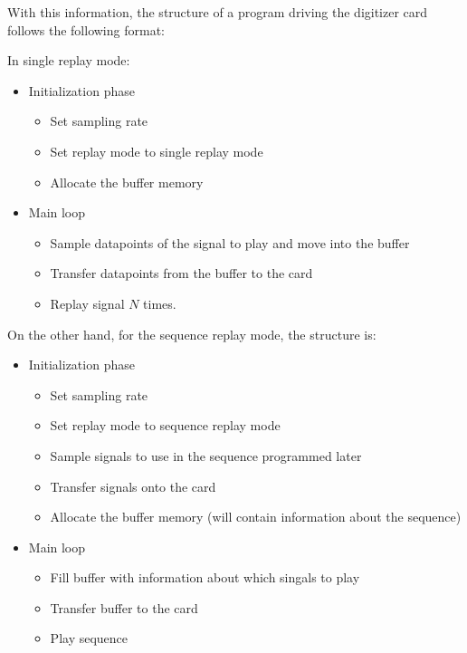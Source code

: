 With this information, the structure of a program driving the digitizer card follows the following format:

\begin{minipage}{\textwidth}
In single replay mode:

\begin{itemize}
\setlength\itemsep{0.0em}
	\item Initialization phase
		\begin{itemize}
			\item Set sampling rate
			\item Set replay mode to single replay mode
			\item Allocate the buffer memory
		\end{itemize}
	\item Main loop
		\begin{itemize}
			\item Sample datapoints of the signal to play and move into the buffer
			\item Transfer datapoints from the buffer to the card
			\item Replay signal $N$ times.
		\end{itemize}
\end{itemize}
\end{minipage}

\begin{minipage}{\textwidth}
On the other hand, for the sequence replay mode, the structure is:

\begin{itemize}
	\item Initialization phase
		\begin{itemize}
			\item Set sampling rate
			\item Set replay mode to sequence replay mode
			\item Sample signals to use in the sequence programmed later
			\item Transfer signals onto the card
			\item Allocate the buffer memory (will contain information about the sequence)
		\end{itemize}
	\item Main loop
		\begin{itemize}
			\item Fill buffer with information about which singals to play
			\item Transfer buffer to the card
			\item Play sequence
		\end{itemize}
\end{itemize}
\end{minipage}

